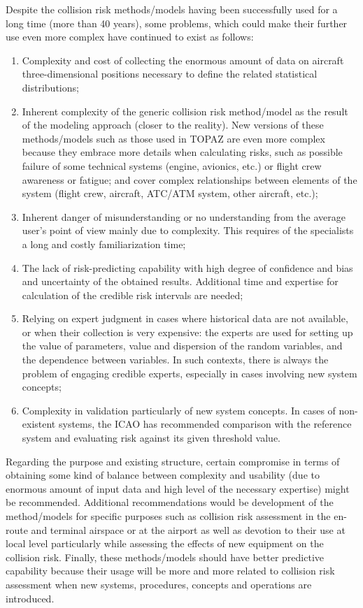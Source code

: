 \documentclass[a4paper, 10pt]{article}
\begin{document}
Despite the collision risk methods/models having been
successfully used for a long time (more than 40 years), some
problems, which could make their further use even more
complex have continued to exist as follows:
\begin{enumerate}
		\item Complexity and cost of collecting the enormous amount
of data on aircraft three-dimensional positions necessary to
define the related statistical distributions;
\item Inherent complexity of the generic collision risk
method/model as the result of the modeling approach (closer to
the reality). New versions of these methods/models such as
those used in TOPAZ are even more complex because they
embrace more details when calculating risks, such as possible
failure of some technical systems (engine, avionics, etc.) or
flight crew awareness or fatigue; and cover complex
relationships between elements of the system (flight crew,
aircraft, ATC/ATM system, other aircraft, etc.);
\item Inherent danger of misunderstanding or no understanding
from the average user’s point of view mainly due to
complexity. This requires of the specialists a long and costly
familiarization time;
\item The lack of risk-predicting capability with high degree of
confidence and bias and uncertainty of the obtained results.
Additional time and expertise for calculation of the credible
risk intervals are needed;
\item Relying on expert judgment in cases where historical
data are not available, or when their collection is very
expensive: the experts are used for setting up the value of
parameters, value and dispersion of the random variables, and
the dependence between variables. In such contexts, there is
always the problem of engaging credible experts, especially in
cases involving new system concepts;
\item Complexity in validation particularly of new system
concepts. In cases of non-existent systems, the ICAO has
recommended comparison with the reference system and
evaluating risk against its given threshold value.\par
\end{enumerate}
Regarding the purpose and existing structure, certain
compromise in terms of obtaining some kind of balance
between complexity and usability (due to enormous amount of
input data and high level of the necessary expertise) might be
recommended. Additional recommendations would be
development of the method/models for specific purposes such
as collision risk assessment in the en-route and terminal
airspace or at the airport as well as devotion to their use at local
level particularly while assessing the effects of new equipment
on the collision risk. Finally, these methods/models should
have better predictive capability because their usage will be
more and more related to collision risk assessment when new
systems, procedures, concepts and operations are introduced.
\end{document}
